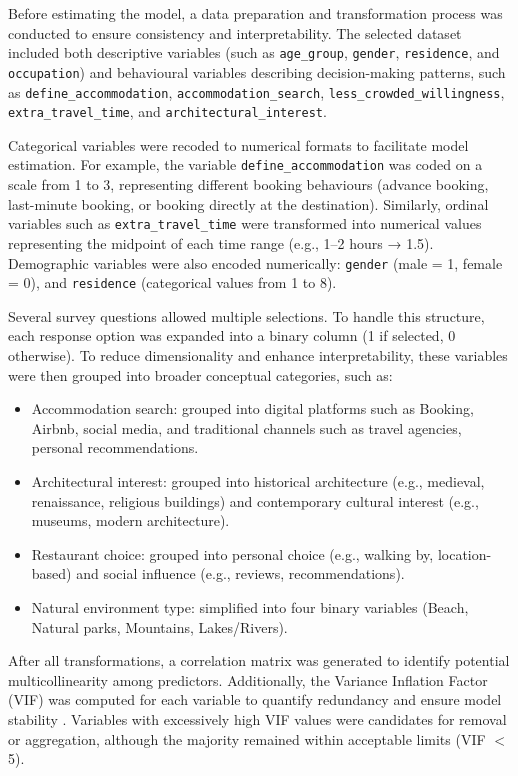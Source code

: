 \documentclass[a4paper, 12pt, twoside]{report}  %
\begin{document}
\indent Before estimating the model, a data preparation and transformation process was conducted to ensure consistency and interpretability. The selected dataset included both descriptive variables (such as \texttt{age\_group}, \texttt{gender}, \texttt{residence}, and \texttt{occupation}) and behavioural variables describing decision-making patterns, such as \texttt{define\_accommodation}, \texttt{accommodation\_search}, \texttt{less\_crowded\_willingness}, \texttt{extra\_travel\_time}, and \texttt{architectural\_interest}.  

\indent Categorical variables were recoded to numerical formats to facilitate model estimation. For example, the variable \texttt{define\_accommodation} was coded on a scale from 1 to 3, representing different booking behaviours (advance booking, last-minute booking, or booking directly at the destination). Similarly, ordinal variables such as \texttt{extra\_travel\_time} were transformed into numerical values representing the midpoint of each time range (e.g., 1–2 hours → 1.5). Demographic variables were also encoded numerically: \texttt{gender} (male = 1, female = 0), and \texttt{residence} (categorical values from 1 to 8).

\indent Several survey questions allowed multiple selections. To handle this structure, each response option was expanded into a binary column (1 if selected, 0 otherwise). To reduce dimensionality and enhance interpretability, these variables were then grouped into broader conceptual categories, such as:

\begin{itemize}
    \item Accommodation search: grouped into digital platforms such as Booking, Airbnb, social media, and traditional channels such as travel agencies, personal recommendations.
    \item Architectural interest: grouped into historical architecture (e.g., medieval, renaissance, religious buildings) and contemporary cultural interest (e.g., museums, modern architecture).
    \item Restaurant choice: grouped into personal choice (e.g., walking by, location-based) and social influence (e.g., reviews, recommendations).
    \item Natural environment type: simplified into four binary variables (Beach, Natural parks, Mountains, Lakes/Rivers).
\end{itemize}

\indent After all transformations, a correlation matrix was generated to identify potential multicollinearity among predictors. Additionally, the Variance Inflation Factor (VIF) was computed for each variable to quantify redundancy and ensure model stability \cite{obrien2007}. Variables with excessively high VIF values were candidates for removal or aggregation, although the majority remained within acceptable limits (VIF $<$ 5).
\end{document}
